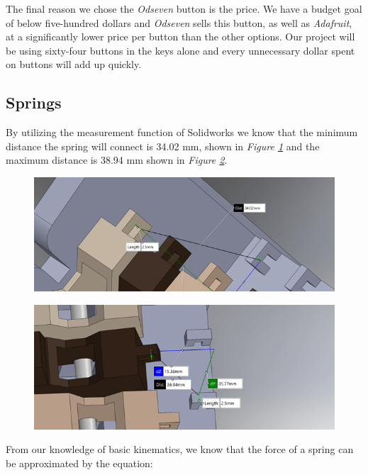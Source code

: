 The final reason we chose the \textit{Odseven} button is the price. We have a budget goal of below five-hundred dollars and \textit{Odseven} sells this button, as well as \textit{Adafruit}, at a significantly lower price per button than the other options. Our project will be using sixty-four buttons in the keys alone and every unnecessary dollar spent on buttons will add up quickly.

\subsection{Springs}
By utilizing the measurement function of Solidworks we know that the minimum distance the spring will connect is 34.02 mm, shown in \textit{Figure \ref{fig:dimensions1}} and the maximum distance is 38.94 mm shown in \textit{Figure \ref{fig:dimensions2}}.

\begin{figure}[h!]
  \centering
  \includegraphics[width=\linewidth]{image/Dimensions1.png}
  \caption{}
  \label{fig:dimensions1}
\end{figure}
\begin{figure}[h!]
  \centering
  \includegraphics[width=\linewidth]{image/Dimensions2.png}
  \caption{}
  \label{fig:dimensions2}
\end{figure}

From our knowledge of basic kinematics, we know that the force of a spring can be approximated by the equation:

